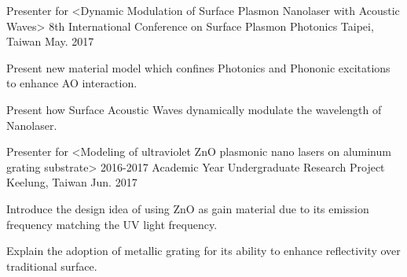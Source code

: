 

\begin{cventries}

  \cventry
    {Presenter for <Dynamic Modulation of Surface Plasmon Nanolaser with Acoustic Waves>} %
    {8th International Conference on Surface Plasmon Photonics} %
    {Taipei, Taiwan} %
    {May. 2017} %
    {
      \begin{cvitems} %
        \item {Present new material model which confines Photonics and Phononic excitations to enhance AO interaction.}
        \item {Present how Surface Acoustic Waves dynamically modulate the wavelength of Nanolaser.}      \end{cvitems}
    }

  \cventry
    {Presenter for <Modeling of ultraviolet ZnO plasmonic nano lasers on aluminum grating substrate>} %
    {2016-2017 Academic Year Undergraduate Research Project} %
    {Keelung, Taiwan} %
    {Jun. 2017} %
    {
      \begin{cvitems} %
        \item {Introduce the design idea of using ZnO as gain material due to its emission frequency matching the UV light frequency.}
        \item {Explain the adoption of metallic grating for its ability to enhance reflectivity over traditional surface.}
      \end{cvitems}
    }

\end{cventries}
